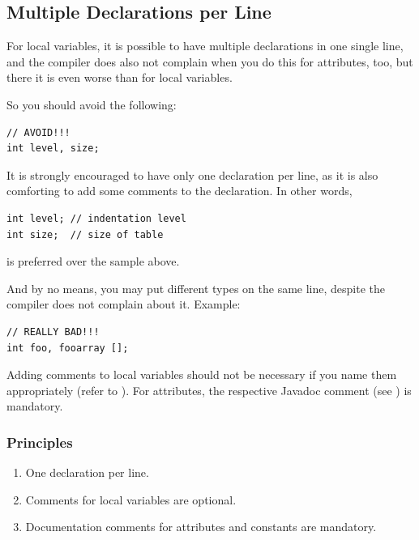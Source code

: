 \subsection{Multiple Declarations per Line}
For local variables, it is possible to have multiple declarations in one single line, and the compiler does also not complain when you do this for attributes, too, but there it is even worse than for local variables.

So you should avoid the following:
\begin{lstlisting}
// AVOID!!!
int level, size;
\end{lstlisting}

It is strongly encouraged to have only one declaration per line, as it is also comforting to add some comments to the declaration. In other words, 
\begin{lstlisting}
int level; // indentation level
int size;  // size of table
\end{lstlisting}

is preferred over the sample above.

And by no means, you may put different types on the same line, despite the compiler does not complain about it. Example:
\begin{lstlisting}
// REALLY BAD!!!
int foo, fooarray [];
\end{lstlisting}

Adding comments to local variables should not be necessary if you name them appropriately (refer to ). For attributes, the respective Javadoc comment (see ) is mandatory.

\subsubsection{Principles}
\begin{enumerate}[label=P\arabic*.]
\item{One declaration per line.}
\item{Comments for local variables are optional.}
\item{Documentation comments for attributes and constants are mandatory.}
\end{enumerate}

